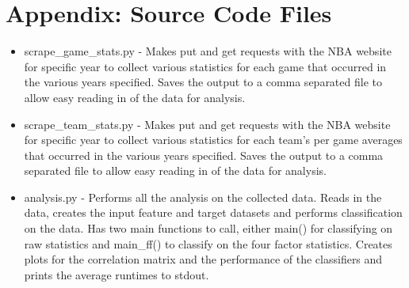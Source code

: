 \documentclass[12pt]{article}%
\begin{document}
\section{Appendix: Source Code Files}
\begin{itemize}
  \item scrape\_game\_stats.py - Makes put and get requests with the NBA website for specific year to collect various statistics for each game that occurred in the various years specified. Saves the output to a comma separated file to allow easy reading in of the data for analysis.

  \item scrape\_team\_stats.py - Makes put and get requests with the NBA website for specific year to collect various statistics for each team's per game averages that occurred in the various years specified. Saves the output to a comma separated file to allow easy reading in of the data for analysis.

  \item analysis.py - Performs all the analysis on the collected data. Reads in the data, creates the input feature and target datasets and performs classification on the data. Has two main functions to call, either main() for classifying on raw statistics and main\_ff() to classify on the four factor statistics. Creates plots for the correlation matrix and the performance of the classifiers and prints the average runtimes to stdout.

\end{itemize}
\end{document}
